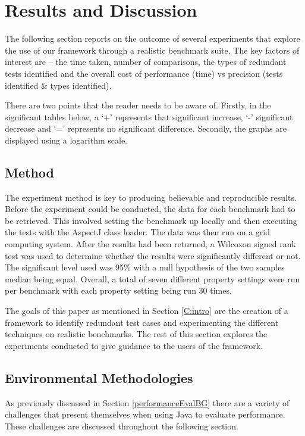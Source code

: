 \chapter{Results and Discussion}\label{C:results}\label{C:evaluation}

The following section reports on the outcome of several experiments that explore the use of our framework through a realistic benchmark suite. The key factors of interest are -- the time taken, number of comparisons, the types of redundant tests identified and the overall cost of performance (time) vs precision (tests identified \& types identified). 

There are two points that the reader needs to be aware of. Firstly, in the significant tables below, a `+' represents that significant increase, `-' significant decrease and `=' represents no significant difference. Secondly, the graphs are displayed using a logarithm scale.

\section{Method}

The experiment method is key to producing believable and reproducible results. Before the experiment could be conducted, the data for each benchmark had to be retrieved. This involved setting the benchmark up locally and then executing the tests with the AspectJ class loader. The data was then run on a grid computing system. After the results had been returned, a Wilcoxon signed rank test \cite{wilcoxon1945individual} was used to determine whether the results were significantly different or not. The significant level used was 95\% with a null hypothesis of the two samples median being equal. Overall, a total of seven different property settings were run per benchmark with each property setting being run 30 times.

The goals of this paper as mentioned in Section \ref{C:intro} are the creation of a framework to identify redundant test cases and experimenting the different techniques on realistic benchmarks. The rest of this section explores the experiments conducted to give guidance to the users of the framework.

\section{Environmental Methodologies}
\label{enviro}
As previously discussed in Section \ref{performanceEvalBG} there are a variety of challenges that present themselves when using Java to evaluate performance. These challenges are discussed throughout the following section.


